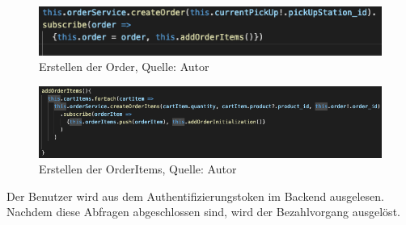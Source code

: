 \begin{figure}[H]
	\centering
	\includegraphics[scale=0.5]{images/createOrder.PNG}
	\caption[Erstellen der Order]{Erstellen der Order, Quelle: Autor}
	\label{img: createOrder}
\end{figure}
\begin{figure}[H]
	\centering
	\includegraphics[width=1\textwidth]{images/createOrderItems.PNG}
	\caption[Erstellen der OrderItems]{Erstellen der OrderItems, Quelle: Autor}
	\label{img: createOrderItems}
\end{figure}

Der Benutzer wird aus dem Authentifizierungstoken im Backend ausgelesen. 
Nachdem diese Abfragen abgeschlossen sind, wird der Bezahlvorgang ausgelöst. 
\newpage
